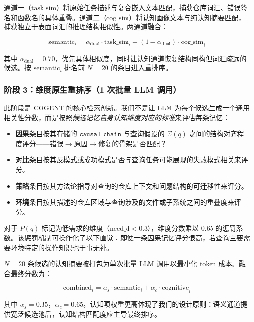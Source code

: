 \documentclass[UTF8,twocolumn]{ctexart}
\begin{document}
通道一（$\text{task\_sim}$）将原始任务描述与复合嵌入文本匹配，捕获仓库词汇、错误签名和函数名的具体重叠。通道二（$\text{cog\_sim}$）将认知画像文本与纯认知摘要匹配，捕获独立于表面词汇的推理结构相似性。两通道融合：

\begin{equation}
    \text{semantic}_i = \alpha_{\text{dual}} \cdot \text{task\_sim}_i + (1 - \alpha_{\text{dual}}) \cdot \text{cog\_sim}_i
\end{equation}

其中 $\alpha_{\text{dual}} = 0.70$，优先具体相似度，同时让认知通道恢复结构同构但词汇疏远的候选。按 $\text{semantic}_i$ 排名前 $N=20$ 的条目进入重排序。

\subsubsection{阶段 3：维度原生重排序（1 次批量 LLM 调用）}

此阶段是 \textsc{COGENT} 的核心检索创新。我们不是让 LLM 为每个候选生成一个通用相关性分数，而是按照\emph{候选记忆自身认知维度对应的标准}来评估每条记忆：

\begin{itemize}
    \item \textbf{因果}条目按其存储的 $\texttt{causal\_chain}$ 与查询假设的 $\Sigma(q)$ 之间的结构对齐程度评分——错误$\to$原因$\to$修复的骨架是否匹配？
    \item \textbf{对比}条目按其反模式或成功模式是否与查询任务可能展现的失败模式相关来评分。
    \item \textbf{策略}条目按其方法论指导对查询的仓库上下文和问题结构的可迁移性来评分。
    \item \textbf{环境}条目按其描述的仓库区域与查询涉及的文件或子系统之间的重叠度来评分。
\end{itemize}

对于 $P(q)$ 标记为低需求的维度（$\text{need\_d} < 0.3$），维度分数乘以 0.65 的惩罚系数。该惩罚机制可操作化了以下直觉：即使一条因果记忆评分很高，若查询主要需要环境特定的操作知识也于事无补。

$N=20$ 条候选的认知摘要被打包为单次批量 LLM 调用以最小化 token 成本。融合最终分数为：

\begin{equation}
    \text{combined}_i = \alpha_s \cdot \text{semantic}_i + \alpha_c \cdot \text{cognitive}_i
\end{equation}

其中 $\alpha_s = 0.35$，$\alpha_c = 0.65$。认知项权重更高体现了我们的设计原则：语义通道提供宽泛候选池后，认知结构匹配度应主导最终排序。
\end{document}
